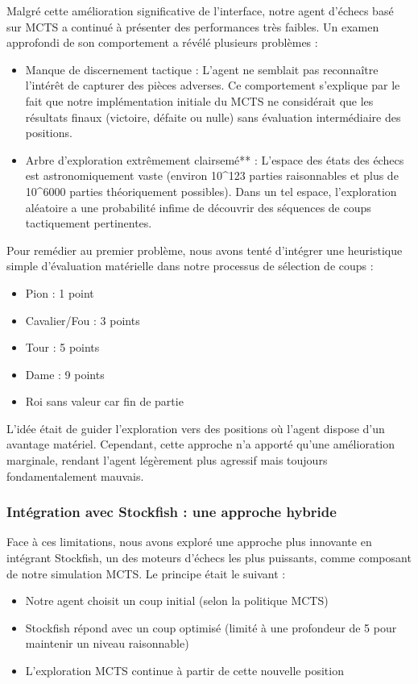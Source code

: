 \documentclass{article}
\begin{document}
Malgré cette amélioration significative de l'interface, notre agent d'échecs basé sur MCTS a continué à présenter des performances très faibles. Un examen approfondi de son comportement a révélé plusieurs problèmes :
\begin{itemize} 
    \item Manque de discernement tactique : L'agent ne semblait pas reconnaître l'intérêt de capturer des pièces adverses. Ce comportement s'explique par le fait que notre implémentation initiale du MCTS ne considérait que les résultats finaux (victoire, défaite ou nulle) sans évaluation intermédiaire des positions.
    \item Arbre d'exploration extrêmement clairsemé** : L'espace des états des échecs est astronomiquement vaste (environ 10\^{}123 parties raisonnables et plus de 10\^{}6000 parties théoriquement possibles). Dans un tel espace, l'exploration aléatoire a une probabilité infime de découvrir des séquences de coups tactiquement pertinentes.
\end{itemize}

Pour remédier au premier problème, nous avons tenté d'intégrer une heuristique simple d'évaluation matérielle dans notre processus de sélection de coups :
\begin{itemize} 
    \item Pion : 1 point
    \item Cavalier/Fou : 3 points
    \item Tour : 5 points
    \item Dame : 9 points
    \item Roi sans valeur car fin de partie
\end{itemize}

L'idée était de guider l'exploration vers des positions où l'agent dispose d'un avantage matériel. Cependant, cette approche n'a apporté qu'une amélioration marginale, rendant l'agent légèrement plus agressif mais toujours fondamentalement mauvais.\\

    \subsubsection{Intégration avec Stockfish : une approche hybride}

    \quad Face à ces limitations, nous avons exploré une approche plus innovante en intégrant Stockfish, un des moteurs d'échecs les plus puissants, comme composant de notre simulation MCTS. Le principe était le suivant :
    \begin{itemize} 
        \item Notre agent choisit un coup initial (selon la politique MCTS)
        \item Stockfish répond avec un coup optimisé (limité à une profondeur de 5 pour maintenir un niveau raisonnable)
        \item L'exploration MCTS continue à partir de cette nouvelle position
    \end{itemize}
    
\end{document}
